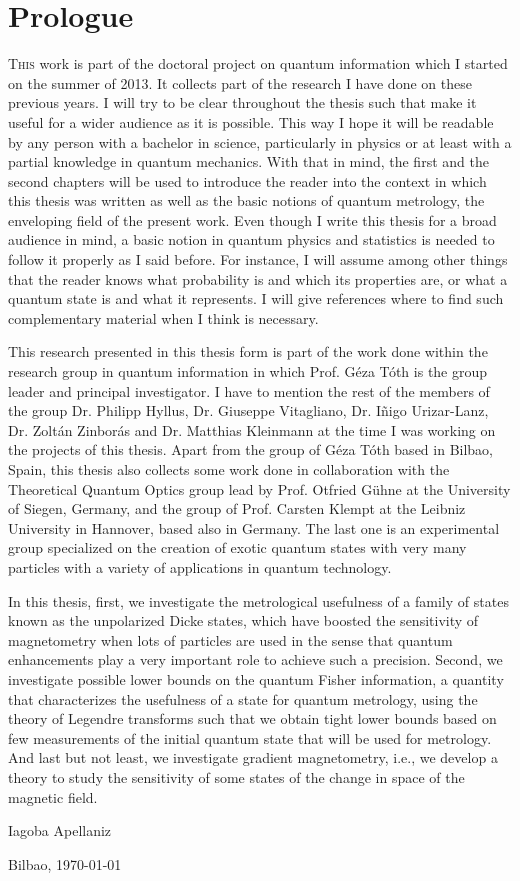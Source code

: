 \section*{Prologue}

\lettrine[lines=2, findent=3pt,nindent=0pt]{T}{his} work is part of the doctoral project on quantum information which I started on the summer of 2013.
It collects part of the research I have done on these previous years.
I will try to be clear throughout the thesis such that make it useful for a wider audience as it is possible.
This way I hope it will be readable by any person with a bachelor in science, particularly in physics or at least with a partial knowledge in quantum mechanics.
With that in mind, the first and the second chapters will be used to introduce the reader into the context in which this thesis was written as well as the basic notions of quantum metrology, the enveloping field of the present work.
Even though I write this thesis for a broad audience in mind, a basic notion in quantum physics and statistics is needed to follow it properly as I said before.
For instance, I will assume among other things that the reader knows what probability is and which its properties are, or what a quantum state is and what it represents.
I will give references where to find such complementary material when I think is necessary.

This research presented in this thesis form is part of the work done within the research group in quantum information in which Prof.
G\'eza T\'oth is the group leader and principal investigator.
I have to mention the rest of the members of the group Dr. Philipp Hyllus, Dr. Giuseppe Vitagliano, Dr. I\~nigo Urizar-Lanz, Dr. Zolt\'an Zinbor\'as and Dr. Matthias Kleinmann at the time I was working on the projects of this thesis.
Apart from the group of G\'eza T\'oth based in Bilbao, Spain, this thesis also collects some work done in collaboration with the Theoretical Quantum Optics group lead by Prof. Otfried G\"uhne at the University of Siegen, Germany, and the group of Prof. Carsten Klempt at the Leibniz University in Hannover, based also in Germany.
The last one is an experimental group specialized on the creation of exotic quantum states with very many particles with a variety of applications in quantum technology.

In this thesis, first, we investigate the metrological usefulness of a family of states known as the unpolarized Dicke states, which have boosted the sensitivity of magnetometry when lots of particles are used in the sense that quantum enhancements play a very important role to achieve such a precision.
Second, we investigate possible lower bounds on the quantum Fisher information, a quantity that characterizes the usefulness of a state for quantum metrology, using the theory of Legendre transforms such that we obtain tight lower bounds based on few measurements of the initial quantum state that will be used for metrology.
And last but not least, we investigate gradient magnetometry, i.e., we develop a theory to study the sensitivity of some states of the change in space of the magnetic field.

\begin{flushright}
  Iagoba Apellaniz

  Bilbao, \today
\end{flushright}
